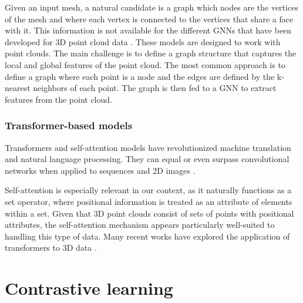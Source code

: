 Given an input mesh, a natural candidate is a graph which nodes are the vertices of the mesh and where each vertex is connected to the vertices that share a face with it. This information is not available for the different GNNs that have been developed for 3D point cloud data \cite{vermaFeaStNetFeatureSteeredGraph2018,wangDynamicGraphCNN2019,dengPPFNetGlobalContext2018}. These models are designed to work with point clouds. The main challenge is to define a graph structure that captures the local and global features of the point cloud. The most common approach is to define a graph where each point is a node and the edges are defined by the k-nearest neighbors of each point. The graph is then fed to a GNN to extract features from the point cloud.

\subsubsection{Transformer-based models}
Transformers \cite{vaswaniAttentionAllYou2023b} and self-attention models have revolutionized machine translation and natural language processing. 
They can equal or even surpass convolutional networks when applied to sequences and 2D images \cite{dosovitskiyImageWorth16x162021}. 

Self-attention is especially relevant in our context, as it naturally functions as a set operator, where positional information is treated as an attribute of elements within a set. Given that 3D point clouds consist of sets of points with positional attributes, the self-attention mechanism appears particularly well-suited to handling this type of data. Many recent works have explored the application of transformers to 3D data \cite{zhaoPointTransformer2021,yuPointBERTPretraining3D2022,liuOpenShapeScaling3D2023}.


\section{Contrastive learning}


